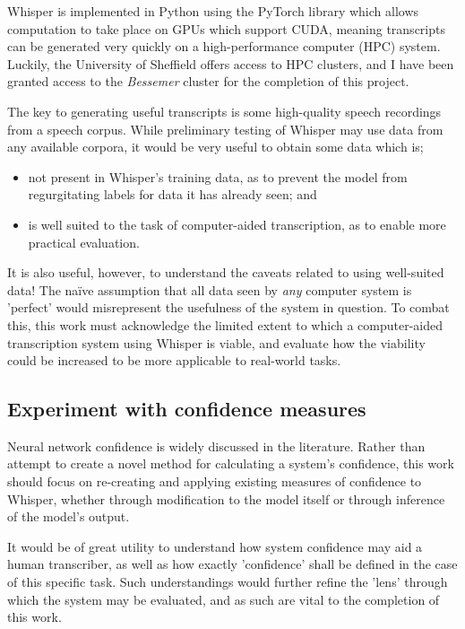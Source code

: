 Whisper\cite{whisper} is implemented in Python using the PyTorch\cite{pytorch} library which allows computation to take place on GPUs which support CUDA, meaning transcripts can be generated very quickly on a high-performance computer (HPC) system.
Luckily, the University of Sheffield offers access to HPC clusters\cite{shef-hpc}, and I have been granted access to the \emph{Bessemer} cluster for the completion of this project.

The key to generating useful transcripts is some high-quality speech recordings from a speech corpus.
While preliminary testing of Whisper may use data from any available corpora, it would be very useful to obtain some data which is;

\begin{itemize}
        \item not present in Whisper's training data, as to prevent the model from regurgitating labels for data it has already seen; and
        \item is well suited to the task of computer-aided transcription, as to enable more practical evaluation.
\end{itemize}

It is also useful, however, to understand the caveats related to using well-suited data!
The na\"{i}ve assumption that all data seen by \emph{any} computer system is 'perfect' would misrepresent the usefulness of the system in question.
To combat this, this work must acknowledge the limited extent to which a computer-aided transcription system using Whisper is viable, and evaluate how the viability could be increased to be more applicable to real-world tasks.

\subsection{Experiment with confidence measures}

Neural network confidence is widely discussed in the literature.
Rather than attempt to create a novel method for calculating a system's confidence, this work should focus on re-creating and applying existing measures of confidence to Whisper, whether through modification to the model itself or through inference of the model's output.

It would be of great utility to understand how system confidence may aid a human transcriber, as well as how exactly 'confidence' shall be defined in the case of this specific task.
Such understandings would further refine the 'lens' through which the system may be evaluated, and as such are vital to the completion of this work.

